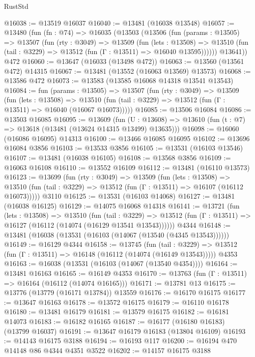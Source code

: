 \begin{lexlean}{RustStd}
\begin{coremodule}
{\begin{coremodule}
{{{{{{{{{{{{{{{{{{{{{{{{{{{{{{{{{{{{{@16038 := @13519 @16037
@16040 := @13481 (@16038 @13548)
@16057 := @13480
    (fun (fn : @74) =>
    @16035
      (@13503
        (@13506
          (fun (params : @13505) =>
          @13507
            (fun (rty : @3049) =>
            @13509
              (fun (lets : @13508) =>
              @13510 (fun (tail : @3229) => @13512 (fun (Γ : @13511) => @16040 @13595))))))
        @13641))
    @472
@16060 := @13647 (@16033 (@13498 @472))
@16063 := @13560 (@13561 @472) @14315
@16067 := @13481 (@13552 (@16063 @13569) @13573)
@16068 := @13586 @472
@16073 := @13583 (@13585 @16068 @14318 @13541 @13543)
@16084 := fun (params : @13505) =>
  @13507
    (fun (rty : @3049) =>
    @13509
      (fun (lets : @13508) =>
      @13510 (fun (tail : @3229) => @13512 (fun (Γ : @13511) => @16040 (@16067 @16073)))))
@16085 := @13506 @16084
@16086 := @13503 @16085
@16095 := @13609
    (fun (U : @13608) => @13610 (fun (t : @7) => @13618 (@13481 (@13624 @14315 @13499) @13635)))
@16098 := @16060 (@16086 @16095) @14313
@16100 := @13466 @16085 @16095
@16102 := @13696 @16084 @3856
@16103 := @13533 @3856
@16105 := @13531 (@16103 @13546)
@16107 := @13481 (@16038 @16105)
@16108 := @13568 @3856
@16109 := @16063 @16108
@16110 := @13552 @16109
@16112 := @13481 (@16110 @13573)
@16123 := @13699
    (fun (rty : @3049) =>
    @13509
      (fun (lets : @13508) =>
      @13510 (fun (tail : @3229) => @13512 (fun (Γ : @13511) => @16107 (@16112 @16073)))))
    @3110
@16125 := @13531 (@16103 @14068)
@16127 := @13481 (@16038 @16125)
@16129 := @14075 @16068 @14318
@16141 := @13721
    (fun (lets : @13508) =>
    @13510
      (fun (tail : @3229) =>
      @13512 (fun (Γ : @13511) => @16127 (@16112 (@14074 (@16129 @13541 @13543))))))
    @4344
@16148 := @13481 (@16038 (@13531 (@16103 (@14067 (@13540 (@4345 @13543))))))
@16149 := @16129 @4344
@16158 := @13745
    (fun (tail : @3229) => @13512 (fun (Γ : @13511) => @16148 (@16112 (@14074 (@16149 @13543)))))
    @4353
@16163 := @16038 (@13531 (@16103 (@14067 (@13540 @4354))))
@16164 := @13481 @16163
@16165 := @16149 @4353
@16170 := @13763 (fun (Γ : @13511) => @16164 (@16112 (@14074 @16165)))
@16171 := @13781 @13
@16175 := @13776 (@13779 (@16171 @13784)) @13559
@16176 := @16170 @16175
@16177 := @13647 @16163
@16178 := @13572 @16175
@16179 := @16110 @16178
@16180 := @13481 @16179
@16181 := @13579 @16175
@16182 := @16181 @14073
@16183 := @16182 @16165
@16187 := @16177 (@16180 @16183) (@13799 @16037)
@16191 := @13647 @16179 @16183 (@13804 @16109)
@16193 := @14143 @16175 @3188
@16194 := @16193 @117
@16200 := @16194 @470 @14148 @86 @4344 @4351 @3522
@16202 := @14157 @16175 @3188
}}}}}}}}}}}}}}}}}}}}}}}}}}}}}}}}}}}}}
\end{coremodule}}
\end{coremodule}
\end{lexlean}
